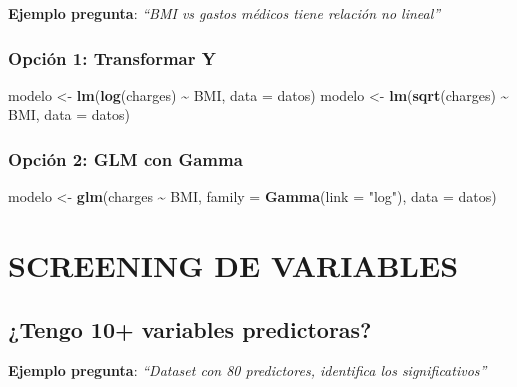 \documentclass[
  10pt,
]{article}
\newenvironment{Shaded}{\begin{snugshade}}{\end{snugshade}}
\newcommand{\AttributeTok}[1]{\textcolor[rgb]{0.13,0.29,0.53}{#1}}
\newcommand{\FunctionTok}[1]{\textcolor[rgb]{0.13,0.29,0.53}{\textbf{#1}}}
\newcommand{\NormalTok}[1]{#1}
\newcommand{\OtherTok}[1]{\textcolor[rgb]{0.56,0.35,0.01}{#1}}
\newcommand{\SpecialCharTok}[1]{\textcolor[rgb]{0.81,0.36,0.00}{\textbf{#1}}}
\newcommand{\StringTok}[1]{\textcolor[rgb]{0.31,0.60,0.02}{#1}}
\begin{document}
\textbf{Ejemplo pregunta}: \emph{``BMI vs gastos médicos tiene relación
no lineal''}

\subsubsection{Opción 1: Transformar Y}\label{opciuxf3n-1-transformar-y}

\begin{Shaded}
\begin{Highlighting}[]
\NormalTok{modelo }\OtherTok{\textless{}{-}} \FunctionTok{lm}\NormalTok{(}\FunctionTok{log}\NormalTok{(charges) }\SpecialCharTok{\textasciitilde{}}\NormalTok{ BMI, }\AttributeTok{data =}\NormalTok{ datos)}
\NormalTok{modelo }\OtherTok{\textless{}{-}} \FunctionTok{lm}\NormalTok{(}\FunctionTok{sqrt}\NormalTok{(charges) }\SpecialCharTok{\textasciitilde{}}\NormalTok{ BMI, }\AttributeTok{data =}\NormalTok{ datos)}
\end{Highlighting}
\end{Shaded}

\subsubsection{Opción 2: GLM con Gamma}\label{opciuxf3n-2-glm-con-gamma}

\begin{Shaded}
\begin{Highlighting}[]
\NormalTok{modelo }\OtherTok{\textless{}{-}} \FunctionTok{glm}\NormalTok{(charges }\SpecialCharTok{\textasciitilde{}}\NormalTok{ BMI, }
              \AttributeTok{family =} \FunctionTok{Gamma}\NormalTok{(}\AttributeTok{link =} \StringTok{"log"}\NormalTok{),}
              \AttributeTok{data =}\NormalTok{ datos)}
\end{Highlighting}
\end{Shaded}

\newpage

\section{SCREENING DE VARIABLES}\label{screening-de-variables}

\subsection{¿Tengo 10+ variables
predictoras?}\label{tengo-10-variables-predictoras}

\textbf{Ejemplo pregunta}: \emph{``Dataset con 80 predictores,
identifica los significativos''}
\end{document}
